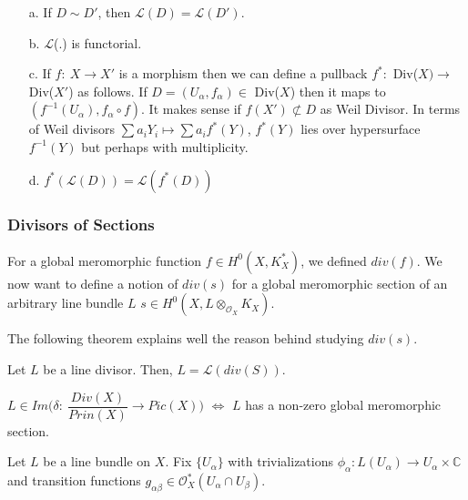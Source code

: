 \begin{remark}

\begin{itemize}
\item[a.] If $D\sim D'$, then $\mathcal{L}(D)=\mathcal{L}(D')$.
\item[b.] $\mathcal{L}$(.) is functorial.
\item[c.] If $f:~X\rightarrow X'$ is a morphism then we can define a pullback $f^*:$ Div($X)\rightarrow$ Div($X'$) as follows. If $D=({U_{\alpha}}, {f_{\alpha}}) \in$ Div($X$) then it maps to $({f^{-1}(U_{\alpha})}, {f_{\alpha}\circ f})$. It makes sense if $f(X') \not\subset D$ as Weil Divisor.
In terms of Weil divisors $\sum a_{i}Y_{i} \mapsto \sum a_{i}f^{*}(Y)$, $f^*(Y)$ lies over hypersurface $f^{-1}(Y)$ but perhaps with multiplicity.
\item[d.] $f^*(\mathcal{L}(D))=\mathcal{L}(f^*(D))$

\end{itemize}
\end{remark}

\subsubsection{Divisors of Sections}

For a global meromorphic function $f \in H^0(X,K^*_{X})$, we defined $div(f)$. We now want to define a notion of $div(s)$ for a global meromorphic section of an arbitrary line bundle $L$ $s \in H^0(X, L\otimes_{\mathcal{O}_{X}}K_X)$.

The following theorem explains well the reason behind studying $div(s)$.

\begin{theorem}
 Let $L$ be a line divisor. Then, $L=\mathcal{L}(div(S))$. 
\end{theorem}

\begin{corollary}

$L \in Im\bigg(\delta:~\dfrac{Div(X)}{Prin(X)} \rightarrow Pic(X)\bigg)$ $\Leftrightarrow$ $L$ has a non-zero global meromorphic section. 
\end{corollary}

Let $L$ be a line bundle on $X$. Fix $\{U_{\alpha}\}$ with trivializations $\phi_{\alpha}:L(U_{\alpha})\rightarrow U_{\alpha} \times \mathbb{C}$ and transition functions $g_{\alpha\beta}\in {\mathcal{O}^*_{X}(U_{\alpha}\cap U_{\beta})}$.


